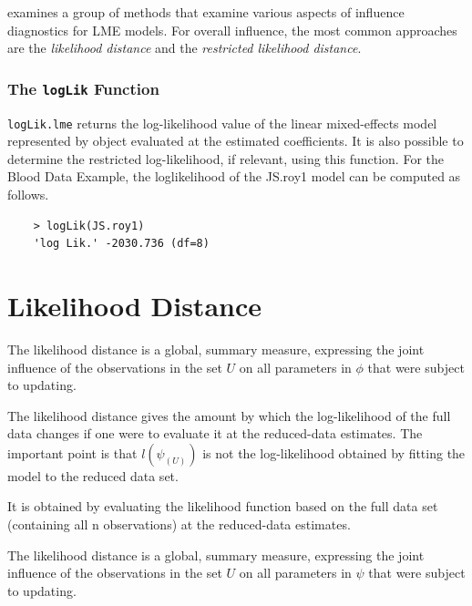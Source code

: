 \documentclass[12pt, a4paper]{report}
\theoremstyle{plain}
\theoremstyle{definition}
\theoremstyle{remark}
\begin{document}
\citet{west} examines a group of methods that examine various aspects of influence diagnostics for LME models.
For overall influence, the most common approaches are the \textit{likelihood distance} and the \textit{restricted likelihood distance}.

\subsubsection{The \texttt{logLik} Function}
\texttt{logLik.lme} returns the log-likelihood value of the linear mixed-effects model represented by object evaluated at the estimated coefficients. It is also possible to determine the restricted log-likelihood, if relevant, using this function. For the Blood Data Example,  the loglikelihood of the JS.roy1 model can be computed as follows.
\begin{framed}
	\begin{verbatim}
	> logLik(JS.roy1)
	'log Lik.' -2030.736 (df=8)
	\end{verbatim}
\end{framed}

\section{Likelihood Distance} %
The  likelihood distance is a global, summary measure, expressing the joint influence of the observations in the set $U$ on all parameters in $\phi$  that were subject to updating.

The likelihood distance gives the amount by which the log-likelihood of the full data changes if one were
to evaluate it at the reduced-data estimates. The important point is that $l(\psi_{(U)})$ is not the log-likelihood
obtained by fitting the model to the reduced data set.

It is obtained by evaluating the likelihood function based on the full data set (containing all n observations) at the reduced-data estimates.

The likelihood distance is a global, summary measure, expressing the joint influence of the observations in
the set $U$ on all parameters in $\psi$  that were subject to updating.







\end{document}
